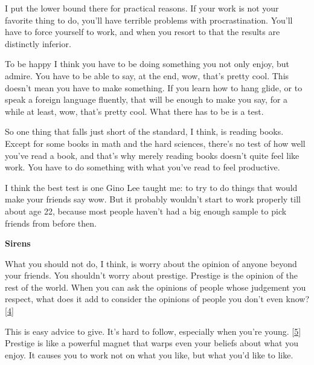 I put the lower bound
                    there for practical reasons. If your work is not your
                    favorite thing to do, you'll have terrible problems with
                    procrastination. You'll have to force yourself to work, and
                    when you resort to that the results are distinctly
                    inferior.

To be happy I think you have to be
                    doing something you not only enjoy, but admire. You have to
                    be able to say, at the end, wow, that's pretty cool. This
                    doesn't mean you have to make something. If you learn how to
                    hang glide, or to speak a foreign language fluently, that
                    will be enough to make you say, for a while at least, wow,
                    that's pretty cool. What there has to be is a test.

So
                    one thing that falls just short of the standard, I think, is
                    reading books. Except for some books in math and the hard
                    sciences, there's no test of how well you've read a book,
                    and that's why merely reading books doesn't quite feel like
                    work. You have to do something with what you've read to feel
                    productive.

I think the best test is one Gino Lee
                    taught me: to try to do things that would make your friends
                    say wow. But it probably wouldn't start to work properly
                    till about age 22, because most people haven't had a big
                    enough sample to pick friends from before then.

\textbf{Sirens}

What you should not do, I think, is worry about
                    the opinion of anyone beyond your friends. You shouldn't
                    worry about prestige. Prestige is the opinion of the rest of
                    the world. When you can ask the opinions of people whose
                    judgement you respect, what does it add to consider the
                    opinions of people you don't even know?
                    [\href{\#f4n}{4}]

This is easy advice to give. It's hard to
                    follow, especially when you're young.
                    [\href{\#f5n}{5}]
                    Prestige is like a powerful magnet that warps even your
                    beliefs about what you enjoy. It causes you to work not on
                    what you like, but what you'd like to like.

